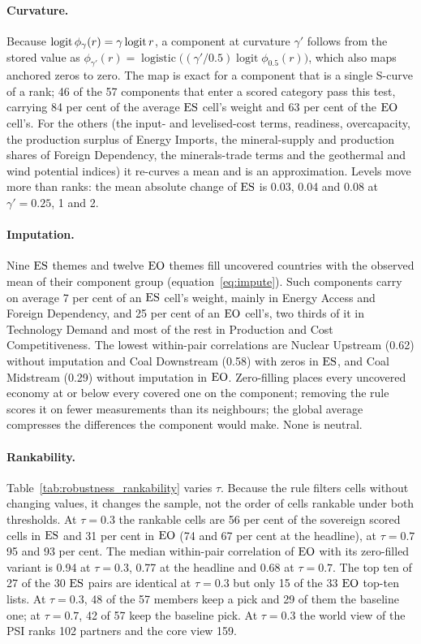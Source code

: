 \paragraph{Curvature.} Because $\operatorname{logit}\phi_{\gamma}(r)=\gamma\operatorname{logit}r$, a
component at curvature $\gamma'$ follows from the stored value as
$\phi_{\gamma'}(r)=\operatorname{logistic}\big((\gamma'/0.5)\operatorname{logit}\phi_{0.5}(r)\big)$,
which also maps anchored zeros to zero. The map is exact for a component that is a single S-curve of
a rank; 46 of the 57 components that enter a scored category pass this test, carrying 84 per cent
of the average $\mathrm{ES}$ cell's weight and 63 per cent of the $\mathrm{EO}$ cell's. For the others (the input-
and levelised-cost terms, readiness, overcapacity, the production surplus of Energy Imports, the
mineral-supply and production shares of Foreign Dependency, the minerals-trade terms and the
geothermal and wind potential indices) it re-curves a mean and is an approximation. Levels move more
than ranks: the mean absolute change of $\mathrm{ES}$ is 0.03, 0.04 and 0.08 at $\gamma'=0.25$, 1 and 2.

\paragraph{Imputation.} Nine $\mathrm{ES}$ themes and twelve $\mathrm{EO}$ themes fill uncovered countries with the
observed mean of their component group (equation~\eqref{eq:impute}). Such components carry on average
7 per cent of an $\mathrm{ES}$ cell's weight, mainly in Energy Access and Foreign Dependency, and 25 per cent
of an $\mathrm{EO}$ cell's, two thirds of it in Technology Demand and most of the rest in Production and Cost
Competitiveness. The lowest within-pair correlations are Nuclear Upstream (0.62) without imputation
and Coal Downstream (0.58) with zeros in $\mathrm{ES}$, and Coal Midstream (0.29) without imputation in
$\mathrm{EO}$. Zero-filling places every uncovered economy at or below every covered one on the component;
removing the rule scores it on fewer measurements than its neighbours; the global average compresses
the differences the component would make. None is neutral.

\paragraph{Rankability.} Table~\ref{tab:robustness_rankability} varies $\tau$. Because the rule
filters cells without changing values, it changes the sample, not the order of cells rankable under
both thresholds. At $\tau=0.3$ the rankable cells are 56 per cent of the sovereign scored cells in
$\mathrm{ES}$ and 31 per cent in $\mathrm{EO}$ (74 and 67 per cent at the headline), at $\tau=0.7$ 95 and 93 per
cent. The median within-pair correlation of $\mathrm{EO}$ with its zero-filled variant is 0.94 at $\tau=0.3$,
0.77 at the headline and 0.68 at $\tau=0.7$. The top ten of 27 of the 30 $\mathrm{ES}$ pairs are identical at
$\tau=0.3$ but only 15 of the 33 $\mathrm{EO}$ top-ten lists. At $\tau=0.3$, 48 of the 57 members keep a pick
and 29 of them the baseline one; at $\tau=0.7$, 42 of 57 keep the baseline pick. At $\tau=0.3$ the
world view of the PSI ranks 102 partners and the core view 159.

